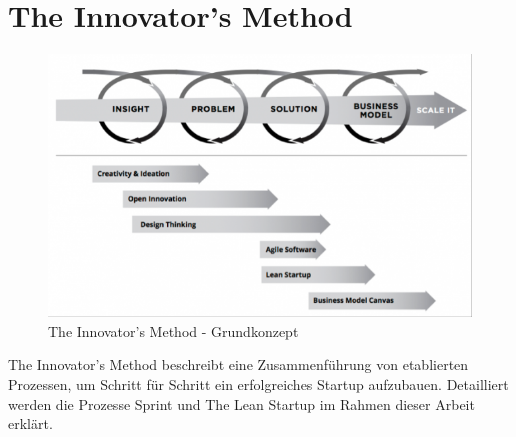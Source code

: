 \section{The Innovator's Method}

\begin{figure}[h!]
	\begin{center}
		\includegraphics[width=\textwidth]{99_IMG/02_Grundlagen/innovatorsMethod.png}
		\caption{The Innovator's Method - Grundkonzept}
		\label{TheInnovatorsMethod}
	\end{center}
\end{figure}

The Innovator's Method beschreibt eine Zusammenführung von etablierten Prozessen, um Schritt für Schritt ein erfolgreiches Startup aufzubauen.
Detailliert werden die Prozesse Sprint und The Lean Startup im Rahmen dieser Arbeit erklärt.
\cite{TheInnovatorsMethod}
\newpage 